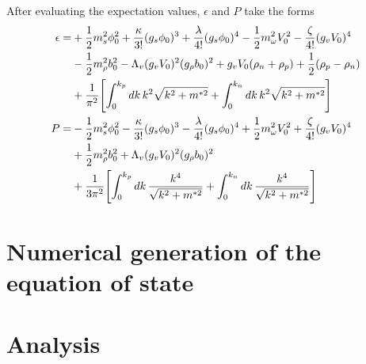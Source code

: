 After evaluating the expectation values, $\epsilon$ and $P$ take the forms
\begin{align}
    \epsilon = & +\frac{1}{2}m_s^2\phi_0^2 + \frac{\kappa}{3!} (g_s\phi_0)^3 + \frac{\lambda}{4!}(g_s\phi_0)^4 - \frac 12 m_\omega^2V_0^2 - \frac{\zeta}{4!}(g_vV_0)^4 \nonumber\\
    & - \frac 12 m_\rho^2 b_0^2 - \Lambda_v(g_vV_0)^2(g_\rho b_0)^2 + g_vV_0(\rho_n + \rho_p) + \frac{1}{2} (\rho_p-\rho_n) \nonumber\\
    & + \frac{1}{\pi^2}\bqty{\int_0^{k_p} \dd{k} k^2 \sqrt{k^2 + m^{*2}} + \int_0^{k_n} \dd{k} k^2 \sqrt{k^2 + m^{*2}}}\\
    P = & -\frac{1}{2}m_s^2\phi_0^2 - \frac{\kappa}{3!} (g_s\phi_0)^3 - \frac{\lambda}{4!}(g_s\phi_0)^4 + \frac 12 m_\omega^2V_0^2 + \frac{\zeta}{4!}(g_vV_0)^4 \nonumber\\
    & + \frac 12 m_\rho^2 b_0^2 + \Lambda_v(g_vV_0)^2(g_\rho b_0)^2 \nonumber\\
    & + \frac{1}{3\pi^2}\bqty{\int_0^{k_p} \dd{k} \frac{k^4}{\sqrt{k^2 + m^{*2}}} + \int_0^{k_n} \dd{k} \frac{k^4}{\sqrt{k^2 + m^{*2}}}}
\end{align}

\section{Numerical generation of the equation of state}



\section{Analysis}